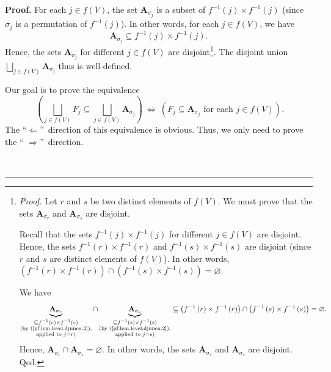 \documentclass[numbers=enddot,12pt,final,onecolumn,notitlepage]{scrartcl}%
\numberwithin{exer}{section}
\theoremstyle{definition}
\newenvironment{proof}[1][Proof]{\noindent\textbf{#1.} }{\ \rule{0.5em}{0.5em}}
\let\sqcupnonlimits\bigsqcup
\renewcommand{\bigsqcup}{\sqcupnonlimits\limits}
\newenvironment{verlong}{}{}
\begin{document}
\begin{verlong}
\begin{proof}
For each $j\in f\left(  V\right)  $, the set $\mathbf{A}_{\sigma_{j}}$ is a
subset of $f^{-1}\left(  j\right)  \times f^{-1}\left(  j\right)  $ (since
$\sigma_{j}$ is a permutation of $f^{-1}\left(  j\right)  $). In other words,
for each $j\in f\left(  V\right)  $, we have%
\begin{equation}
\mathbf{A}_{\sigma_{j}}\subseteq f^{-1}\left(  j\right)  \times f^{-1}\left(
j\right)  . \label{pf.lem.level.djunex.2}%
\end{equation}
Hence, the sets $\mathbf{A}_{\sigma_{j}}$ for different $j\in f\left(
V\right)  $ are disjoint\footnote{\textit{Proof.} Let $r$ and $s$ be two
distinct elements of $f\left(  V\right)  $. We must prove that the sets
$\mathbf{A}_{\sigma_{r}}$ and $\mathbf{A}_{\sigma_{s}}$ are disjoint.
\par
Recall that the sets $f^{-1}\left(  j\right)  \times f^{-1}\left(  j\right)  $
for different $j\in f\left(  V\right)  $ are disjoint. Hence, the sets
$f^{-1}\left(  r\right)  \times f^{-1}\left(  r\right)  $ and $f^{-1}\left(
s\right)  \times f^{-1}\left(  s\right)  $ are disjoint (since $r$ and $s$ are
distinct elements of $f\left(  V\right)  $). In other words, $\left(
f^{-1}\left(  r\right)  \times f^{-1}\left(  r\right)  \right)  \cap\left(
f^{-1}\left(  s\right)  \times f^{-1}\left(  s\right)  \right)  =\varnothing$.
\par
We have%
\[
\underbrace{\mathbf{A}_{\sigma_{r}}}_{\substack{\subseteq f^{-1}\left(
r\right)  \times f^{-1}\left(  r\right)  \\\text{(by
(\ref{pf.lem.level.djunex.2}),}\\\text{applied to }j=r\text{)}}}\cap
\underbrace{\mathbf{A}_{\sigma_{s}}}_{\substack{\subseteq f^{-1}\left(
s\right)  \times f^{-1}\left(  s\right)  \\\text{(by
(\ref{pf.lem.level.djunex.2}),}\\\text{applied to }j=s\text{)}}}\subseteq
\left(  f^{-1}\left(  r\right)  \times f^{-1}\left(  r\right)  \right)
\cap\left(  f^{-1}\left(  s\right)  \times f^{-1}\left(  s\right)  \right)
=\varnothing.
\]
Hence, $\mathbf{A}_{\sigma_{r}}\cap\mathbf{A}_{\sigma_{s}}=\varnothing$. In
other words, the sets $\mathbf{A}_{\sigma_{r}}$ and $\mathbf{A}_{\sigma_{s}}$
are disjoint. Qed.}. The disjoint union $\bigsqcup_{j\in f\left(  V\right)
}\mathbf{A}_{\sigma_{j}}$ thus is well-defined.

Our goal is to prove the equivalence%
\[
\ \left(  \bigsqcup_{j\in f\left(  V\right)  }F_{j}\subseteq\bigsqcup_{j\in
f\left(  V\right)  }\mathbf{A}_{\sigma_{j}}\right)  \ \Longleftrightarrow
\ \left(  F_{j}\subseteq\mathbf{A}_{\sigma_{j}}\text{ for each }j\in f\left(
V\right)  \right)  .
\]
The \textquotedblleft$\Longleftarrow$\textquotedblright\ direction of this
equivalence is obvious. Thus, we only need to prove the \textquotedblleft%
$\Longrightarrow$\textquotedblright\ direction.


\end{proof}
\end{verlong}
\end{document}
